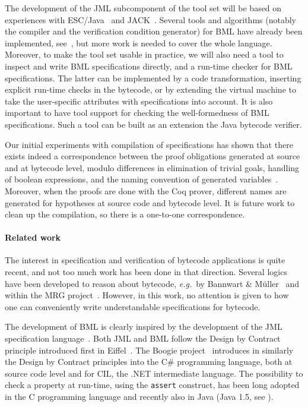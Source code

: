 The development of the JML subcomponent of the tool set will be based
on experiences with ESC/Java~\cite{CokK04} and JACK~\cite{BurdyRL03}.
Several tools and algorithms (notably the compiler and the
verification condition generator) for BML have already been
implemented, see~\cite{BP06JSV,Pavlova:phd}, but more work is needed
to cover the whole language. Moreover, to make the tool set usable in
practice, we will also need a tool to inspect and write BML
specifications directly, and a run-time checker for BML
specifications. The latter can be implemented by a code
transformation, inserting explicit run-time checks in the bytecode, or
by extending the virtual machine to take the user-specific attributes
with specifications into account.  It is also important to have tool
support for checking the well-formedness of BML specifications. Such a
tool can be built as an extension the Java bytecode verifier.

Our initial experiments with compilation of specifications has shown
that there exists indeed a correspondence between the proof
obligations generated at source and at bytecode level, modulo
differences in elimination of trivial goals, handling of boolean
expressions, and the naming convention of generated
variables~\cite{Pavlova:phd}. Moreover, when the proofs are done with
the Coq prover, different names are generated for hypotheses at source
code and bytecode level. It is future work to clean up the
compilation, so there is a one-to-one correspondence.




 

\paragraph{Related work}
The interest in specification and verification of bytecode
applications is quite recent, and not too much work has been done in
that direction. Several logics have been developed to reason about
bytecode, \emph{e.g.}~by Bannwart \& M\"uller~\cite{BannwartMueller05}
and within the MRG project~\cite{AspinallEtAl:TPHOLs2004}. However, in
this work, no attention is given to how one can conveniently write
understandable specifications for bytecode.

The development of BML is clearly inspired by the development of the
JML specification language~\cite{JMLReferenceManual05}. Both JML and
BML follow the Design by Contract principle introduced first in
Eiffel~\cite{Meyer97}. The Boogie project~\cite{BarnettCDJL05}
introduces in similarly the Design by Contract principles into the C\#
programming language, both at source code level and for CIL, the .NET
intermediate language.  The possibility to check a property at
run-time, using the \texttt{assert} construct, has been long 
adopted in the C programming language and recently also in Java (Java
1.5, see \cite[\S 14.10]{JLS}). 

